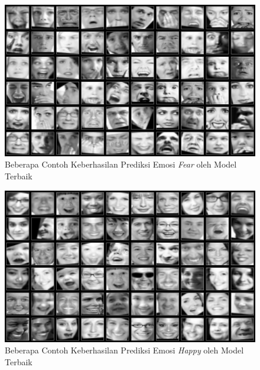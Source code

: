\begin{figure}[!t]
    \centering
    \includegraphics[width=14cm]{gambar/contoh_hasil_prediksi_true_fear.png}
    \caption{Beberapa Contoh Keberhasilan Prediksi Emosi \textit{Fear} oleh Model Terbaik}
    \label{fig:hasilprediksitrue2}
\end{figure}

\begin{figure}[!t]
    \centering
    \includegraphics[width=14cm]{gambar/contoh_hasil_prediksi_true_happy.png}
    \caption{Beberapa Contoh Keberhasilan Prediksi Emosi \textit{Happy} oleh Model Terbaik}
    \label{fig:hasilprediksitrue3}
\end{figure}

